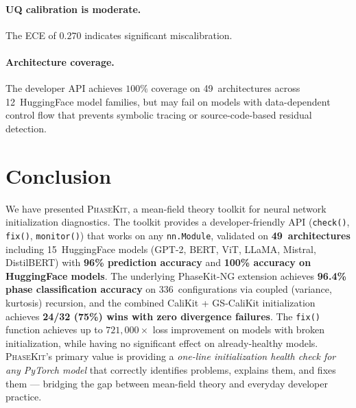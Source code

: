 \documentclass[10pt]{article}
\newcommand{\ToolName}{\textsc{PhaseKit}}
\begin{document}
\paragraph{UQ calibration is moderate.}
The ECE of $0.270$ indicates significant miscalibration.

\paragraph{Architecture coverage.}
The developer API achieves $100\%$ coverage on 49~architectures across 12~HuggingFace model families, but may fail on models with data-dependent control flow that prevents symbolic tracing or source-code-based residual detection.

\section{Conclusion}
\label{sec:conclusion}

We have presented \ToolName{}, a mean-field theory toolkit for neural network initialization diagnostics.
The toolkit provides a developer-friendly API (\texttt{check()}, \texttt{fix()}, \texttt{monitor()}) that works on any \texttt{nn.Module}, validated on \textbf{49~architectures} including 15~HuggingFace models (GPT-2, BERT, ViT, LLaMA, Mistral, DistilBERT) with \textbf{96\% prediction accuracy} and \textbf{100\% accuracy on HuggingFace models}.
The underlying PhaseKit-NG extension achieves \textbf{96.4\% phase classification accuracy} on 336~configurations via coupled (variance, kurtosis) recursion, and the combined CaliKit + GS-CaliKit initialization achieves \textbf{24/32 (75\%) wins with zero divergence failures}.
The \texttt{fix()} function achieves up to $721{,}000\times$ loss improvement on models with broken initialization, while having no significant effect on already-healthy models.
\ToolName{}'s primary value is providing a \emph{one-line initialization health check for any PyTorch model} that correctly identifies problems, explains them, and fixes them --- bridging the gap between mean-field theory and everyday developer practice.


\end{document}
